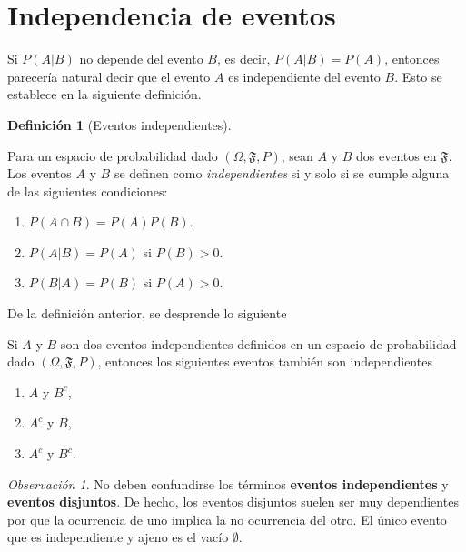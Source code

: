 \documentclass[
  us-letterpaper,
]{scrreprt}
\theoremstyle{plain}
\theoremstyle{definition}
\newtheorem{definition}{Definición}[chapter]
\theoremstyle{definition}
\theoremstyle{plain}
\theoremstyle{remark}
\newtheorem*{remark}{Observación}
\begin{document}
\section{Independencia de eventos}\label{independencia-de-eventos}

Si \(P(A|B)\) no depende del evento \(B\), es decir, \(P(A|B)=P(A)\),
entonces parecería natural decir que el evento \(A\) es independiente
del evento \(B\). Esto se establece en la siguiente definición.

\begin{definition}[Eventos
independientes]\protect\hypertarget{def-evind}{}\label{def-evind}

Para un espacio de probabilidad dado \((\Omega, \mathfrak{F}, P)\), sean
\(A\) y \(B\) dos eventos en \(\mathfrak{F}\). Los eventos \(A\) y \(B\)
se definen como \emph{independientes} si y solo si se cumple alguna de
las siguientes condiciones:

\begin{enumerate}
\def\labelenumi{\roman{enumi}.}
\item
  \(P(A\cap B)= P(A)P(B)\).
\item
  \(P(A|B)=P(A)\) si \(P(B)>0\).
\item
  \(P(B|A)=P(B)\) si \(P(A)>0\).
\end{enumerate}

\end{definition}

De la definición anterior, se desprende lo siguiente

\label{thm}
Si \(A\) y \(B\) son dos eventos independientes definidos en un espacio
de probabilidad dado \((\Omega, \mathfrak{F}, P)\), entonces los
siguientes eventos también son independientes

\begin{enumerate}
\def\labelenumi{\roman{enumi}.}
\item
  \(A\) y \(B^c\),
\item
  \(A^c\) y \(B\),
\item
  \(A^c\) y \(B^c\).
\end{enumerate}

\begin{remark}
No deben confundirse los términos \textbf{eventos independientes} y
\textbf{eventos disjuntos}. De hecho, los eventos disjuntos suelen ser
muy dependientes por que la ocurrencia de uno implica la no ocurrencia
del otro. El único evento que es independiente y ajeno es el vacío
\(\emptyset\).
\end{remark}
\end{document}
